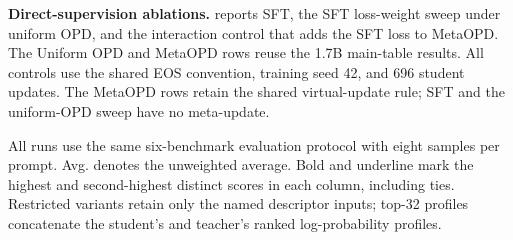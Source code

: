 \documentclass{article}
\theoremstyle{plain}
\theoremstyle{definition}
\theoremstyle{remark}
\begin{document}
\textbf{Direct-supervision ablations.}
 reports SFT, the SFT loss-weight sweep under uniform OPD, and the interaction control that adds the SFT loss to MetaOPD. The Uniform OPD and MetaOPD rows reuse the 1.7B main-table results. All controls use the shared EOS convention, training seed 42, and 696 student updates. The MetaOPD rows retain the shared virtual-update rule; SFT and the uniform-OPD sweep have no meta-update.

\begin{table}[t]
\centering
\caption{Feature-composition ablation on Qwen3-1.7B-Base (\%).}
\label{tab:metaopd-feature-ablation}
\vspace{1mm}
\parbox{0.98\textwidth}{\footnotesize All runs use the same six-benchmark evaluation protocol with eight samples per prompt. Avg. denotes the unweighted average. Bold and underline mark the highest and second-highest distinct scores in each column, including ties. Restricted variants retain only the named descriptor inputs; top-32 profiles concatenate the student's and teacher's ranked log-probability profiles.}
\end{table}
\end{document}
